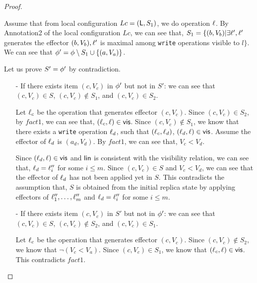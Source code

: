 \begin {proof}
\begin{itemize}
\begin{itemize}

    Assume that from local configuration $Lc = (\mathsf{L},S_1)$, we do operation $\ell$. By Annotation2 of the local configuration $Lc$, we can see that, $S_1 = \{ (b,V_b) \vert \exists \ell', \ell'$ generates the effector $(b,V_b), \ell'$ is maximal among {\tt write} operations visible to $l \}$. We can see that $\phi' = \phi \setminus S_1 \cup \{ (a,V_a) \}$.

    Let us prove $S' = \phi'$ by contradiction.

        \begin{itemize}
        \setlength{\itemsep}{0.5pt}
        \item[-] If there exists item $(c,V_c)$ in $\phi'$ but not in $S'$: we can see that $(c,V_c) \in S$, $(c,V_c) \notin S_1$, and $(c,V_c) \in S_2$.

        Let $\ell_c$ be the operation that generates effector $(c,V_c)$. Since $(c,V_c) \in S_2$, by $fact1$, we can see that, $(\ell_c,\ell) \in \mathsf{vis}$. Since $(c,V_c) \notin S_1$, we know that there exists a {\tt write} operation $\ell_d$, such that $(\ell_c,\ell_d)$, $(\ell_d,\ell) \in \mathsf{vis}$. Assume the effector of $\ell_d$ is $(a_d,V_d)$. By $fact1$, we can see that, $V_c < V_d$.

        Since $(\ell_d,\ell) \in \mathsf{vis}$ and $\mathsf{lin}$ is consistent with the visibility relation, we can see that, $\ell_d = \ell''_i$ for some $i \leq m$. Since $(c,V_c) \in S$ and $V_c < V_d$, we can see that the effector of $\ell_d$ has not been applied yet in $S$. This contradicts the assumption that, $S$ is obtained from the initial replica state by applying effectors of $\ell''_1,\ldots,\ell''_m$ and $\ell_d = \ell''_i$ for some $i \leq m$.



        \item[-] If there exists item $(c,V_c)$ in $S'$ but not in $\phi'$: we can see that $(c,V_c) \in S$, $(c,V_c) \notin S_2$, and $(c,V_c) \in S_1$.

        Let $\ell_c$ be the operation that generates effector $(c,V_c)$. Since $(c,V_c) \notin S_2$, we know that $\neg(V_c < V_a)$. Since $(c,V_c) \in S_1$, we know that $(\ell_c,\ell) \in \mathsf{vis}$. This contradicts $fact1$.
        \end{itemize}


\end{itemize}
\end{itemize}
\end{proof}
